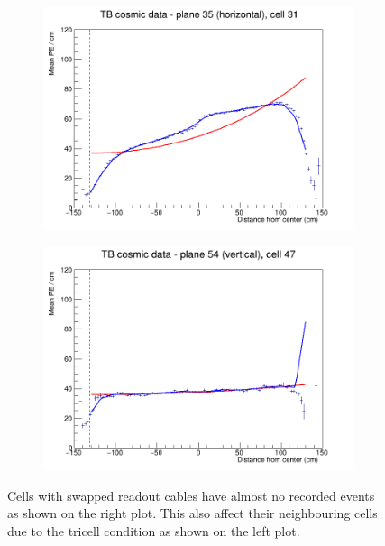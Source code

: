 \documentclass[12pt,a4paper]{article}
\begin{document}
\begin{figure}[h]
  \begin{subfigure}{0.5\textwidth}
    \includegraphics[width=\linewidth]{RelativeCalibrationResults/p4_035_031.png}
  \end{subfigure}
  \begin{subfigure}{0.5\textwidth}
    \includegraphics[width=\linewidth]{RelativeCalibrationResults/p4_054_047.png}
  \end{subfigure}
  \caption{Cells with swapped readout cables have almost no recorded events as shown on the right plot. This also affect their neighbouring cells due to the tricell condition as shown on the left plot.}
  \label{figAttenfitResultsPeriod4}
\end{figure}
\end{document}

